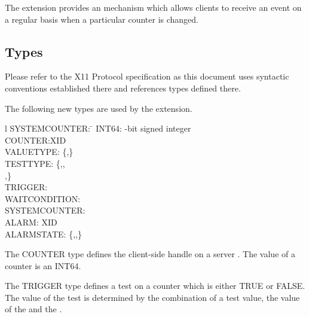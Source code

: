 The extension provides an  mechanism which allows clients to
receive an event on a regular basis when a particular counter is changed.

\subsection*{Types}

Please refer to the X11 Protocol specification as this document uses
syntactic conventions established there and references types defined there.

The following new types are used by the extension.

\begin{tabbing}{l}
SYSTEMCOUNTER: \=\kill
	INT64:	-bit signed integer\\
	COUNTER:\>XID\\
  	VALUETYPE:\>  \{,\}\\
 	TESTTYPE:\> \{,,\\
		\>,\}\\
	TRIGGER:\\
	WAITCONDITION:\\
	SYSTEMCOUNTER:\\
	ALARM:	\>XID\\
	ALARMSTATE:\> \{,,\}\\
\end{tabbing}

The COUNTER type defines the client-side handle on a server .
The value of a counter is an INT64.

The TRIGGER type defines a test on a counter which is either TRUE or FALSE.
The value of the test is determined by the combination of a test value, the
value of the  and the .

